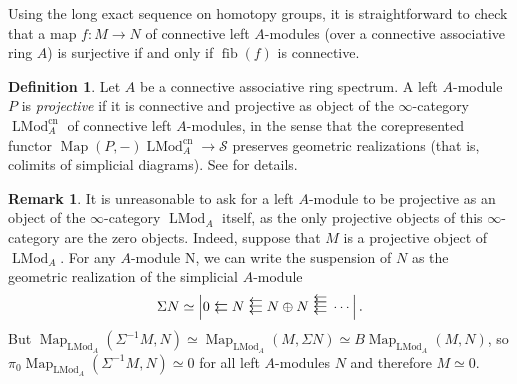 \documentclass{article}
\theoremstyle{definition}
\newtheorem{definition}{Definition}[subsection]
\newtheorem{remark}{Remark}[subsection]
\renewcommand{\S}{\mathcal{S}}
\DeclareMathOperator{\LMod}{LMod}
\DeclareMathOperator{\Map}{Map}
\DeclareMathOperator{\fib}{fib}
\newcommand{\cn}{\mathrm{cn}}
\def\llarrow{  \hspace{.05cm}\mbox{\,\put(0,-2){$\leftarrow$}\put(0,2){$\leftarrow$}\hspace{.45cm}}}
\def\lllarrow{ \hspace{.05cm}\mbox{\,\put(0,-3){$\leftarrow$}\put(0,1){$\leftarrow$}\put(0,5){$\leftarrow$}\hspace{.45cm}}}
\def\llllarrow{\hspace{.05cm}\mbox{\,\put(0,-3){$\leftarrow$}\put(0,.5){$\leftarrow$}\put(0,4){$\leftarrow$}\put(0,7.5){$\leftarrow$}
               \hspace{.45cm}}}
\begin{document}
Using the long exact sequence on homotopy groups, it is straightforward to check that a map $f:M\to N$ of connective left $A$-modules (over a connective associative ring $A$) is surjective if and only if $\fib(f)$ is connective.

\begin{definition}
Let $A$ be a connective associative ring spectrum. A left $A$-module $P$ is {\em projective} if it is connective and projective as object of the $\infty$-category $\LMod^{\cn}_A$ of connective left $A$-modules, in the sense that the corepresented functor $\Map(P,-)\LMod^{\cn}_A\to\S$ preserves geometric realizations (that is, colimits of simplicial diagrams). See \cite[Definition 5.5.8.18]{HTT} for details.
\end{definition}

\begin{remark}
It is unreasonable to ask for a left $A$-module to be projective as an object of the $\infty$-category $\LMod_A$ itself, as the only projective objects of this $\infty$-category are the zero objects.
Indeed, suppose that $M$ is a projective object of $\LMod_A$. For any $A$-module N, we can write the suspension of $N$ as the geometric realization of the simplicial $A$-module
\[
\Sigma N\simeq \left| 0\llarrow N\lllarrow N\oplus N\llllarrow\cdots\right|.
\]
But $
\Map_{\LMod_A}(\Sigma^{-1}M,N)\simeq\Map_{\LMod_A}(M,\Sigma N)\simeq
B\Map_{\LMod_A}(M,N)$,
so $\pi_0 \Map_{\LMod_A}(\Sigma^{-1} M, N)\simeq 0$ for all left $A$-modules $N$ and therefore $M\simeq 0$.
\end{remark}
\end{document}
